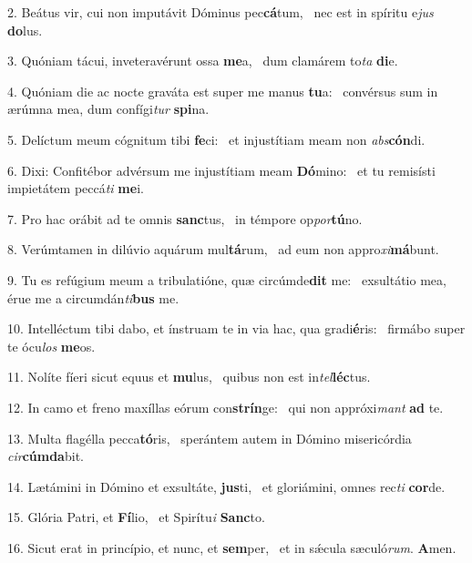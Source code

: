2. Beátus vir, cui non imputávit Dóminus pec\textbf{cá}tum, \ast\  nec est in spíritu e\textit{jus} \textbf{do}lus.\

3. Quóniam tácui, inveteravérunt ossa \textbf{me}a, \ast\  dum clamárem to\textit{ta} \textbf{di}e.\

4. Quóniam die ac nocte graváta est super me manus \textbf{tu}a: \ast\  convérsus sum in ærúmna mea, dum confígi\textit{tur} \textbf{spi}na.\

5. Delíctum meum cógnitum tibi \textbf{fe}ci: \ast\  et injustítiam meam non \textit{abs}\textbf{cón}di.\

6. Dixi: Confitébor advérsum me injustítiam meam \textbf{Dó}mino: \ast\  et tu remisísti impietátem peccá\textit{ti} \textbf{me}i.\

7. Pro hac orábit ad te omnis \textbf{sanc}tus, \ast\  in témpore op\textit{por}\textbf{tú}no.\

8. Verúmtamen in dilúvio aquárum mul\textbf{tá}rum, \ast\  ad eum non appro\textit{xi}\textbf{má}bunt.\

9. Tu es refúgium meum a tribulatióne, quæ circúmde\textbf{dit} me: \ast\  exsultátio mea, érue me a circumdán\textit{ti}\textbf{bus} me.\

10. Intelléctum tibi dabo, et ínstruam te in via hac, qua gradi\textbf{é}ris: \ast\  firmábo super te ócu\textit{los} \textbf{me}os.\

11. Nolíte fíeri sicut equus et \textbf{mu}lus, \ast\  quibus non est in\textit{tel}\textbf{léc}tus.\

12. In camo et freno maxíllas eórum con\textbf{strín}ge: \ast\  qui non appróxi\textit{mant} \textbf{ad} te.\

13. Multa flagélla pecca\textbf{tó}ris, \ast\  sperántem autem in Dómino misericórdia \textit{cir}\textbf{cúm}\textbf{da}bit.\

14. Lætámini in Dómino et exsultáte, \textbf{jus}ti, \ast\  et gloriámini, omnes rec\textit{ti} \textbf{cor}de.\

15. Glória Patri, et \textbf{Fí}lio, \ast\  et Spirítu\textit{i} \textbf{Sanc}to.\

16. Sicut erat in princípio, et nunc, et \textbf{sem}per, \ast\  et in sǽcula sæculó\textit{rum}. \textbf{A}men.\

